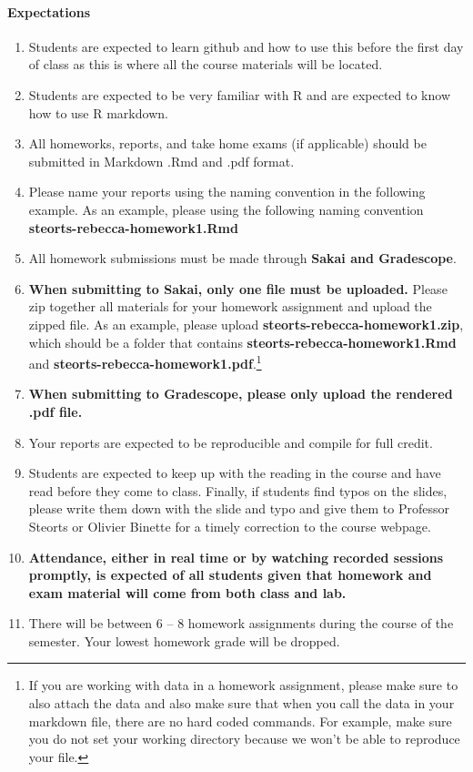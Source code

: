 \documentclass[11pt]{article}
\begin{document}
\paragraph{Expectations}
\begin{enumerate}
\item Students are expected to learn github and how to use this before the first day of class as this is where all the course materials will be located. 
\item Students are expected to be very familiar with R and are expected to know how to use R markdown. 
\item All homeworks, reports, and take home exams (if applicable) should be submitted in Markdown .Rmd and .pdf format. 
\item Please name your reports using the naming convention in the following example. As an example, please using the following naming convention \textbf{steorts-rebecca-homework1.Rmd} 
\item All homework submissions must be made through \textbf{Sakai and Gradescope}.
\item  \textbf{When submitting to Sakai, only one file must be uploaded.} Please zip together all materials for your homework assignment and upload the zipped file. As an example, please upload \textbf{steorts-rebecca-homework1.zip}, which should be a folder that contains \textbf{steorts-rebecca-homework1.Rmd}  and \textbf{steorts-rebecca-homework1.pdf}.\footnote{If you are working with data in a homework assignment, please make sure to also attach the data and also make sure that when you call the data in your markdown file, there are no hard coded commands. For example, make sure you do not set your working directory because we won't be able to reproduce your file.}
\item \textbf{When submitting to Gradescope, please only upload the rendered .pdf file.}
\item Your reports are expected to be reproducible and compile for full credit. 
\item Students are expected to keep up with the reading in the course and have read before they come to class. Finally, if students find typos on the slides, please write them down with the slide and typo and give them to Professor Steorts or Olivier Binette for a timely correction to the course webpage.  
\item \textbf{Attendance, either in real time or by watching recorded sessions promptly, is expected of all students given that homework and exam material will come from both class and lab.}
\item There will be between 6 -- 8 homework assignments during the course of the semester.  Your lowest homework grade will be dropped. 
\end{enumerate}
\end{document}
